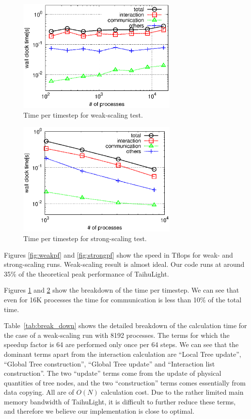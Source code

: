 \documentclass[oribibl]{llncs}
\begin{document}
\begin{figure}
  \begin{center}
    \includegraphics[width=8cm,clip]{./fig/weak.eps}
  \end{center}
  \caption{Time per timestep for weak-scaling test. }
  \label{fig:weak}
\end{figure}

\begin{figure}
  \begin{center}
    \includegraphics[width=8cm,clip]{./fig/strong.eps}
  \end{center}
  \caption{Time per timestep for strong-scaling test.}
  \label{fig:strong}
\end{figure}

Figures \ref{fig:weakpf} and \ref{fig:strongpf} show the speed in
Tflops for weak- and strong-scaling runs.  Weak-scaling result is almost
ideal. Our code runs at around 35\% of the theoretical peak
performance of TaihuLight.


Figures \ref{fig:weak} and \ref{fig:strong} show the breakdown of the
time per timestep. We can see that even for 16K processes the time for
communication is less than 10\% of the total time.


Table~\ref{tab:break_down} shows the detailed breakdown of the
calculation time for the case of a weak-scaling run with 8192 processes.
The terms for which the speedup factor is 64 are performed only once
per 64 steps. We can see that the dominant terms apart from the
interaction calculation are ``Local Tree update'', ``Global Tree
construction'', ``Global Tree update'' and ``Interaction list
construction''.  The two ``update'' terms come from the update of
physical quantities of tree nodes, and the two ``construction'' terms
comes essentially from data copying. All are of $O(N)$ calculation cost.
Due to the rather limited main memory bandwidth of TaihuLight, it is
difficult to further reduce these terms, and therefore we believe our
implementation is close to optimal.
\end{document}
